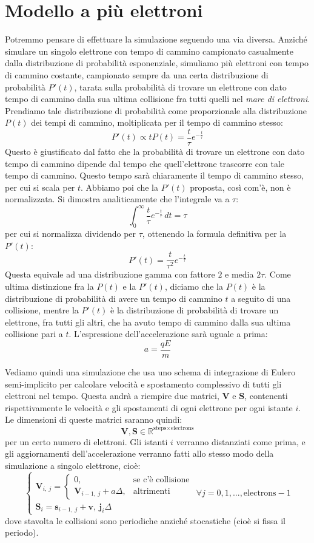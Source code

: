 \documentclass[a4paper,11pt]{article}
\begin{document}
\section{Modello a più elettroni}
Potremmo pensare di effettuare la simulazione seguendo una via diversa. Anziché simulare un singolo elettrone con tempo di cammino campionato casualmente dalla distribuzione di probabilità esponenziale, simuliamo più elettroni con tempo di cammino costante, campionato sempre da una certa distribuzione di probabilità $P'(t)$, tarata sulla probabilità di trovare un elettrone con dato tempo di cammino dalla sua ultima collisione fra tutti quelli nel \textit{mare di elettroni}. Prendiamo tale distribuzione di probabilità come proporzionale alla distribuzione $P(t)$ dei tempi di cammino, moltiplicata per il tempo di cammino stesso:
$$
P'(t) \propto t P(t) = \frac{t}{\tau} e^{-\frac{t}{\tau}}
$$
Questo è giustificato dal fatto che la probabilità di trovare un elettrone con dato tempo di cammino dipende dal tempo che quell'elettrone trascorre con tale tempo di cammino. Questo tempo sarà chiaramente il tempo di cammino stesso, per cui si scala per $t$. Abbiamo poi che la $P'(t)$ proposta, così com'è, non è normalizzata. Si dimostra analiticamente che l'integrale va a $\tau$:
$$
\int_0^\infty \frac{t}{\tau} e^{-\frac{t}{\tau}} \, dt = \tau
$$
per cui si normalizza dividendo per $\tau$, ottenendo la formula definitiva per la $P'(t)$:
$$
P'(t) = \frac{t}{\tau^2} e^{-\frac{t}{\tau}}
$$
Questa equivale ad una distribuzione gamma con fattore $2$ e media $2 \tau$. 
Come ultima distinzione fra la $P(t)$ e la $P'(t)$, diciamo che la $P(t)$ è la distribuzione di probabilità di avere un tempo di cammino $t$ a seguito di una collisione, mentre la $P'(t)$ è la distribuzione di probabilità di trovare un elettrone, fra tutti gli altri, che ha avuto tempo di cammino dalla sua ultima collisione pari a $t$.
L'espressione dell'accelerazione sarà uguale a prima:
$$
a = \frac{q E}{m}
$$

Vediamo quindi una simulazione che usa uno schema di integrazione di Eulero semi-implicito per calcolare velocità e spostamento complessivo di tutti gli elettroni nel tempo. Questa andrà a riempire due matrici, $\mathbf{V}$ e $\mathbf{S}$, contenenti rispettivamente le velocità e gli spostamenti di ogni elettrone per ogni istante $i$. Le dimensioni di queste matrici saranno quindi:
$$
\mathbf{V}, \mathbf{S} \in \mathbb{R}^{\text{steps} \times \text{electrons}}
$$
per un certo numero di elettroni.
Gli istanti $i$ verranno distanziati come prima, e gli aggiornamenti dell'accelerazione verranno fatti allo stesso modo della simulazione a singolo elettrone, cioè:
$$
\begin{cases}
	\mathbf{V}_{i, \ j} = 
	\begin{cases}
		0, & \text{se c'è collisione} \\
		\mathbf{V}_{i - 1, \ j} + a \Delta, & \text{altrimenti}
	\end{cases} 
	\\
	\mathbf{S}_i = \mathbf{s}_{i - 1, \ j} + \mathbf{v, \ j}_i \Delta
\end{cases}
\forall j = 0, 1, ..., \text{electrons} - 1
$$
dove stavolta le collisioni sono periodiche anziché stocastiche (cioè si fissa il periodo).
\end{document}
